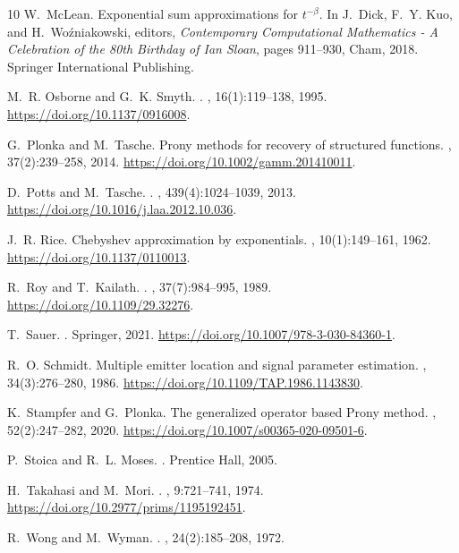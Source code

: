 \documentclass[12pt]{article}
\begin{document}
\begin{thebibliography}{10}
W.~McLean.
\newblock Exponential sum approximations for $t^{-\beta}$.
\newblock In J.~Dick, F.~Y. Kuo, and H.~Wo{\'{z}}niakowski, editors, {\em
  Contemporary Computational Mathematics - A Celebration of the 80th Birthday
  of Ian Sloan}, pages 911--930, Cham, 2018. Springer International Publishing.

M.~R. Osborne and G.~K. Smyth.
.
, 16(1):119--138, 1995.
\newblock \url{ https://doi.org/10.1137/0916008}.

G.~Plonka and M.~Tasche.
\newblock Prony methods for recovery of structured functions.
, 37(2):239--258, 2014.
\newblock \url{https://doi.org/10.1002/gamm.201410011}.

D.~Potts and M.~Tasche.
.
, 439(4):1024--1039, 2013.
\newblock \url{https://doi.org/10.1016/j.laa.2012.10.036}.

J.~R. Rice.
\newblock Chebyshev approximation by exponentials.
,
  10(1):149--161, 1962.
\newblock \url{https://doi.org/10.1137/0110013}.

R.~Roy and T.~Kailath.
.
,
  37(7):984--995, 1989.
\newblock \url{https://doi.org/10.1109/29.32276}.

T.~Sauer.
.
\newblock Springer, 2021.
\newblock \url{https://doi.org/10.1007/978-3-030-84360-1}.

R.~O. Schmidt.
\newblock Multiple emitter location and signal parameter estimation.
, 34(3):276--280,
  1986.
\newblock \url{https://doi.org/10.1109/TAP.1986.1143830}.

K.~Stampfer and G.~Plonka.
\newblock The generalized operator based {P}rony method.
, 52(2):247--282, 2020.
\newblock \url{https://doi.org/10.1007/s00365-020-09501-6}.

P.~Stoica and R.~L. Moses.
.
\newblock Prentice Hall, 2005.

H.~Takahasi and M.~Mori.
.
, 9:721--741, 1974.
\newblock \url{https://doi.org/10.2977/prims/1195192451}.

R.~Wong and M.~Wyman.
.
, 24(2):185--208, 1972.

\end{thebibliography}
\end{document}
